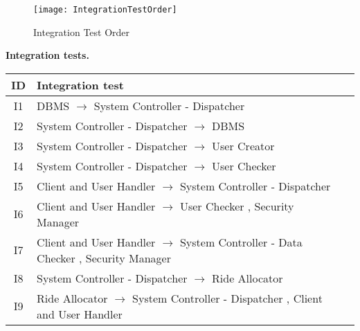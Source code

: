 \documentclass[\mainpath/main]{subfiles}
\begin{document}
\begin{figure}[h]
	\centering
	\texttt{[image: IntegrationTestOrder]}
	\caption{Integration Test Order}
	\label{IntegrationStrategy:SequenceofComponent_FunctionIntegration:SoftwareIntegrationSequence:IntegrationTestOrder}
\end{figure}

\clearpage

\textbf{Integration tests.}\\
\begin{table}[h]
	\centering
	\begin{tabular}[!ht]{c|p{12cm}c}
		ID & Integration test & \\ \hline
		I1 &  \centering DBMS $\rightarrow$ System Controller - Dispatcher  & \\ \hline
		I2 & \centering System Controller - Dispatcher $\rightarrow$ DBMS  & \\ \hline
		I3 & \centering System Controller - Dispatcher $\rightarrow$ User Creator   & \\ \hline
		I4 & \centering System Controller - Dispatcher $\rightarrow$ User Checker   & \\ \hline
		I5 & \centering Client and User Handler $\rightarrow$ System Controller - Dispatcher   & \\ \hline
		I6 & \centering Client and User Handler $\rightarrow$ User Checker , Security Manager   & \\ \hline
		I7 & \centering Client and User Handler $\rightarrow$ System Controller - Data Checker , Security Manager   & \\ \hline
		I8 & \centering System Controller - Dispatcher $\rightarrow$ Ride Allocator   & \\ \hline
		I9 & \centering Ride Allocator $\rightarrow$ System Controller - Dispatcher , Client and User Handler   & \\ \hline
	\end{tabular}
\end{table}
\end{document}
